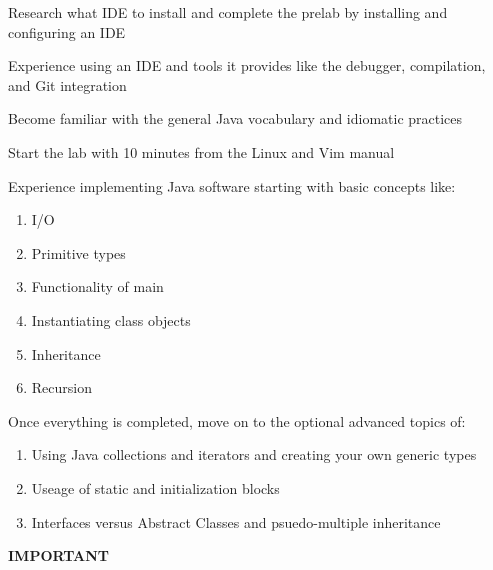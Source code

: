 \documentclass[../../main.tex]{subfiles}
\begin{document}
\begin{steps}
   \item Research what IDE to install and complete the prelab by installing and configuring an IDE
   \item Experience using an IDE and tools it provides like the debugger, compilation, and Git
      integration
   \item Become familiar with the general Java vocabulary and idiomatic practices
   \item Start the lab with 10 minutes from the Linux and Vim manual
   \item Experience implementing Java software starting with basic concepts like:
   \begin{enumerate}[label=\Alph*.]
         \item I/O
         \item Primitive types
         \item Functionality of main
         \item Instantiating class objects
         \item Inheritance
         \item Recursion
      \end{enumerate}
   \item Once everything is completed, move on to the optional advanced topics of:
   \begin{enumerate}[label=\Alph*.]
         \item Using Java collections and iterators and creating your own generic types
         \item Useage of static and initialization blocks
         \item Interfaces versus Abstract Classes and psuedo-multiple inheritance
      \end{enumerate}
\end{steps}

\vspace{5cm}

\begin{center}
   {\Huge\bfseries IMPORTANT}
\end{center}

\end{document}
